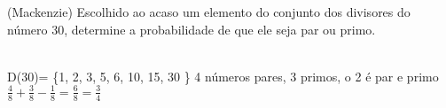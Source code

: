 \begin{ex}
(Mackenzie) Escolhido ao acaso um elemento do conjunto dos divisores do número 30, determine a probabilidade de que ele seja par ou primo.
  \begin{sol}
   \phantom{A} \\
   D(30)= \{1, 2, 3, 5, 6, 10, 15, 30 \} 4 números pares, 3 primos, o 2 é par e primo \\
   $\frac{4}{8}+\frac{3}{8}-\frac{1}{8}=\frac{6}{8}=\frac{3}{4}$
  \end{sol}
\end{ex}